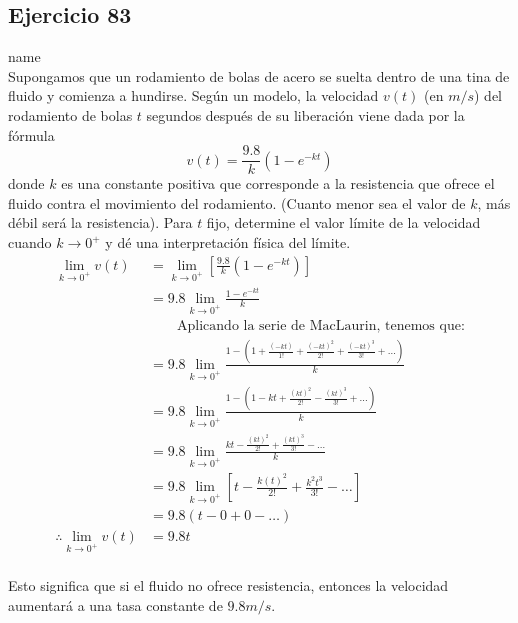 \documentclass[12pt]{article}
\begin{document}
\subsection{Ejercicio 83} name \\

Supongamos que un rodamiento  de bolas de acero se suelta dentro de una tina de fluido y comienza a hundirse. Según un modelo, la velocidad $v(t)$ (en $m/s$) del rodamiento de bolas $t$ segundos después de su liberación viene dada por la fórmula
\[
v(t)=\frac{9.8}{k}(1-e^{-kt})
\]
donde $k$ es una constante positiva que corresponde a la resistencia que ofrece el fluido contra el movimiento del rodamiento. (Cuanto menor sea el valor de $k$, más débil será la resistencia).
Para $t$ fijo, determine el valor límite de la velocidad cuando $k\rightarrow 0^+$ y dé una interpretación física del límite.
\[ \begin{equation*}
  \begin{split}
    \lim_{k \to 0^+} v(t)
    &= \lim_{k \to 0^+} \left[ \frac{9.8}{k}(1-e^{-kt}) \right] \\
    &= 9.8 \lim_{k \to 0^+} \frac{1-e^{-kt}}{k} \\
    & \qquad \text{Aplicando la serie de MacLaurin, tenemos que:} \\
    &= 9.8 \lim_{k \to 0^+} \frac{1-
      \left(1+\frac{(-kt)}{1!}+\frac{(-kt)^2}{2!}+\frac{(-kt)^3}{3!}+\ldots \right)
    }{k} \\
    &= 9.8 \lim_{k \to 0^+} \frac{1-
      \left(1-kt+\frac{(kt)^2}{2!}-\frac{(kt)^3}{3!}+\ldots \right)
    }{k} \\
    &= 9.8 \lim_{k \to 0^+} \frac{kt-\frac{(kt)^2}{2!}+\frac{(kt)^3}{3!}-\ldots}{k} \\
    &= 9.8 \lim_{k \to 0^+} \left[ t-\frac{k(t)^2}{2!}+\frac{k^2t^3}{3!}-\ldots \right] \\
    &= 9.8 ( t-0+0-\ldots ) \\
    \therefore
    \lim_{k \to 0^+} v(t)
    &= 9.8 t \\
  \end{split}
\end{equation*} \]

Esto significa que si el fluido no ofrece resistencia, entonces la velocidad aumentará a una tasa constante de $9.8 m/s$.

\end{document}
